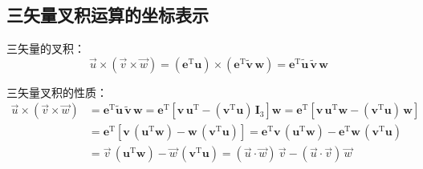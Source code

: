 \subsection{三矢量叉积运算的坐标表示}

三矢量的叉积：
\begin{equation}\label{eq:4.double_cross}
\vec{u} \times (\vec{v} \times \vec{w}) = (\boldsymbol{e}^{\mathrm{T}} \boldsymbol{u}) \times (\boldsymbol{e}^{\mathrm{T}} \tilde{\boldsymbol{v}}\, \boldsymbol{w}) = \boldsymbol{e}^{\mathrm{T}} \tilde{\boldsymbol{u}}\, \tilde{\boldsymbol{v}}\, \boldsymbol{w}
\end{equation}

三矢量叉积的性质：
\begin{align}
\vec{u} \times (\vec{v} \times \vec{w}) &= \boldsymbol{e}^{\mathrm{T}} \tilde{\boldsymbol{u}}\, \tilde{\boldsymbol{v}}\, \boldsymbol{w} = \boldsymbol{e}^{\mathrm{T}} \left[\boldsymbol{v}\, \boldsymbol{u}^{\mathrm{T}} - (\boldsymbol{v}^{\mathrm{T}} \boldsymbol{u})\, \boldsymbol{I}_3\right] \boldsymbol{w} = \boldsymbol{e}^{\mathrm{T}} \left[\boldsymbol{v}\, \boldsymbol{u}^{\mathrm{T}} \boldsymbol{w} - (\boldsymbol{v}^{\mathrm{T}} \boldsymbol{u})\, \boldsymbol{w}\right] \nonumber \\
&= \boldsymbol{e}^{\mathrm{T}} \left[\boldsymbol{v}\, (\boldsymbol{u}^{\mathrm{T}} \boldsymbol{w}) - \boldsymbol{w}\, (\boldsymbol{v}^{\mathrm{T}} \boldsymbol{u})\right] = \boldsymbol{e}^{\mathrm{T}} \boldsymbol{v}\, (\boldsymbol{u}^{\mathrm{T}} \boldsymbol{w}) - \boldsymbol{e}^{\mathrm{T}} \boldsymbol{w}\, (\boldsymbol{v}^{\mathrm{T}} \boldsymbol{u}) \nonumber \\
&= \vec{v}\, (\boldsymbol{u}^{\mathrm{T}} \boldsymbol{w}) - \vec{w}\, (\boldsymbol{v}^{\mathrm{T}} \boldsymbol{u}) = (\vec{u} \cdot \vec{w})\, \vec{v} - (\vec{u} \cdot \vec{v})\, \vec{w}
\end{align}

